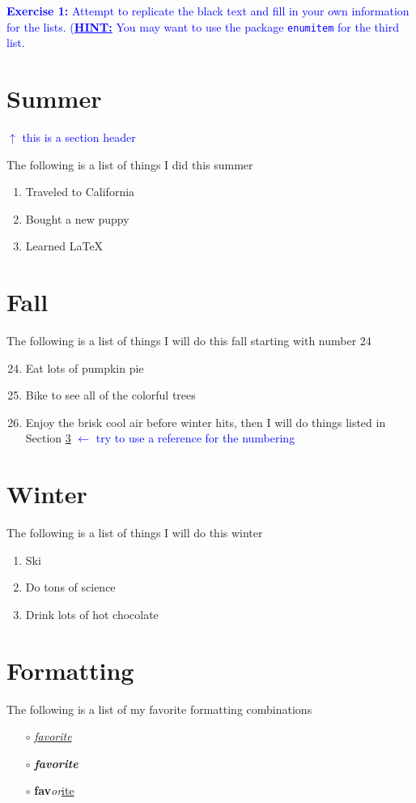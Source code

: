 \documentclass[]{article}
\newcommand{\BlueText}[1]{\textcolor{blue}{#1}}
\begin{document}
\noindent \BlueText{\textbf{Exercise 1:} Attempt to replicate the black text and fill in your own information for the lists.
(\textbf{\underline{HINT:}} You may want to use the package \texttt{enumitem} for the third list.}

\section{Summer}
\label{sec:summer}
\BlueText{$\uparrow$ this is a section header}

\noindent The following is a list of things I did this summer
\begin{enumerate}
	\item Traveled to California
	\item Bought a new puppy
	\item Learned \LaTeX\
\end{enumerate}

\section{Fall}
\label{sec:fall}
The following is a list of things I will do this fall starting with number 24
\begin{enumerate}
	\setcounter{enumi}{23}
	\item Eat lots of pumpkin pie
	\item Bike to see all of the colorful trees
	\item Enjoy the brisk cool air before winter hits, then I will do things listed in Section \ref{sec:winter} \BlueText{$\leftarrow$ try to use a reference for the numbering}
\end{enumerate}

\section{Winter}
\label{sec:winter}
The following is a list of things I will do this winter
\begin{enumerate}[label=(\roman*)]
	\item Ski
	\item Do tons of science
	\item Drink lots of hot chocolate
\end{enumerate}

\section{Formatting}
\label{sec:formatting}
The following is a list of my favorite formatting combinations
\begin{itemize}
	\item[$\circ$] \underline{\textit{favorite}}
	\item[$\circ$] \textbf{\textit{favorite}}
	\item[$\circ$] \textbf{fav}\textit{or}\underline{ite}
\end{itemize}
\end{document}
